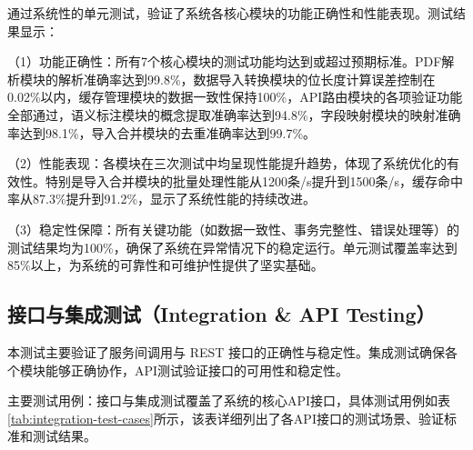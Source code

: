 \begin{table}[H]
\centering
\caption{导入合并模块单元测试结果}
\label{tab:import-merge-test}
\end{table}

通过系统性的单元测试，验证了系统各核心模块的功能正确性和性能表现。测试结果显示：

（1）功能正确性：所有7个核心模块的测试功能均达到或超过预期标准。PDF解析模块的解析准确率达到99.8\%，数据导入转换模块的位长度计算误差控制在0.02\%以内，缓存管理模块的数据一致性保持100\%，API路由模块的各项验证功能全部通过，语义标注模块的概念提取准确率达到94.8\%，字段映射模块的映射准确率达到98.1\%，导入合并模块的去重准确率达到99.7\%。

（2）性能表现：各模块在三次测试中均呈现性能提升趋势，体现了系统优化的有效性。特别是导入合并模块的批量处理性能从1200条/s提升到1500条/s，缓存命中率从87.3\%提升到91.2\%，显示了系统性能的持续改进。

（3）稳定性保障：所有关键功能（如数据一致性、事务完整性、错误处理等）的测试结果均为100\%，确保了系统在异常情况下的稳定运行。单元测试覆盖率达到85\%以上，为系统的可靠性和可维护性提供了坚实基础。


\subsection{接口与集成测试（Integration \& API Testing）}

本测试主要验证了服务间调用与 REST 接口的正确性与稳定性。集成测试确保各个模块能够正确协作，API测试验证接口的可用性和稳定性。


主要测试用例：接口与集成测试覆盖了系统的核心API接口，具体测试用例如表\ref{tab:integration-test-cases}所示，该表详细列出了各API接口的测试场景、验证标准和测试结果。


